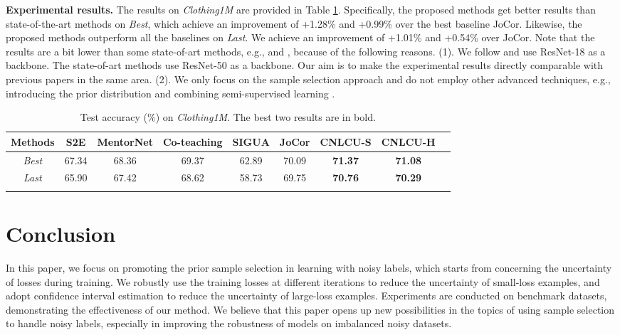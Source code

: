 \documentclass[11pt]{article}
\begin{document}
\textbf{Experimental results.} The results on \textit{Clothing1M} are provided in Table \ref{tab:clothing1m}. Specifically, the proposed methods get better results than state-of-the-art methods on \textit{Best}, which achieve an improvement of +1.28\% and +0.99\% over the best baseline JoCor. Likewise, the proposed methods outperform all the baselines on \textit{Last}. We achieve an improvement of +1.01\% and +0.54\% over JoCor. Note that the results are  a bit lower than some state-of-art methods, e.g., \citep{yi2019probabilistic} and \citep{tanaka2018joint}, because of the following reasons. (1). We follow \citep{wei2020combating} and use ResNet-18 as a backbone. The  state-of-art methods \citep{yi2019probabilistic,tanaka2018joint} use ResNet-50 as a backbone. Our aim is to make the experimental results directly comparable with previous papers \citep{wei2020combating} in the same area. (2). We only focus on the sample selection approach and do not employ other advanced techniques, e.g., introducing the prior distribution \citep{tanaka2018joint} and combining semi-supervised learning \citep{li2020dividemix,nguyen2020self,liu2020early}.
\begin{table}[h]
\centering
{
		\begin{tabular}{c|cccccccc}
\Xhline{3\arrayrulewidth}
			 Methods & S2E & MentorNet & Co-teaching & SIGUA & JoCor & CNLCU-S & CNLCU-H \\ \hline
			 \textit{Best} & 67.34 & 68.36 & 69.37 & 62.89 & 70.09 & \textbf{71.37} & \textbf{71.08}\\ \hline
			 \textit{Last} & 65.90 & 67.42 & 68.62 & 58.73 & 69.75 & \textbf{70.76} & \textbf{70.29}\\ \hline
			 \Xhline{3\arrayrulewidth}
\end{tabular}
	}
	\caption{Test accuracy (\%) on \textit{Clothing1M}. The best two results are in bold.}
	\label{tab:clothing1m}
\end{table}
\section{Conclusion}\label{sec:4}
In this paper, we focus on promoting the prior sample selection in learning with noisy labels, which starts from concerning the uncertainty of losses during training. We robustly use the training losses at different iterations to reduce the uncertainty of small-loss examples, and adopt confidence interval estimation to reduce the uncertainty of large-loss examples. Experiments are conducted on benchmark datasets, demonstrating the effectiveness of our method. We believe that this paper opens up new possibilities in the topics of using sample selection to handle noisy labels, especially in improving the robustness of models on imbalanced noisy datasets. 
\end{document}
